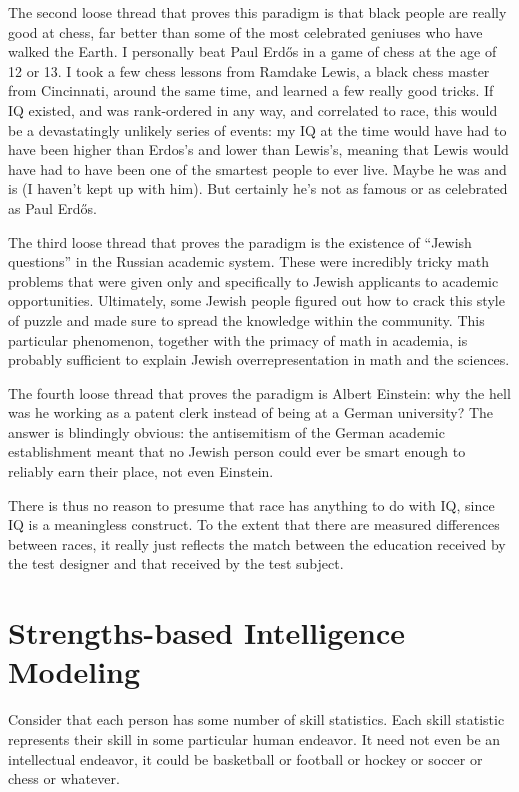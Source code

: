 \documentclass[11pt]{article}
\begin{document}
The second loose thread that proves this paradigm is that black people
are really good at chess, far better than some of the most celebrated
geniuses who have walked the Earth. I personally beat Paul Erd\H{o}s
in a game of chess at the age of 12 or 13. I took a few chess lessons
from Ramdake Lewis, a black chess master from Cincinnati, around the
same time, and learned a few really good tricks. If IQ existed, and
was rank-ordered in any way, and correlated to race, this would be a
devastatingly unlikely series of events: my IQ at the time would have
had to have been higher than Erdos's and lower than Lewis's, meaning
that Lewis would have had to have been one of the smartest people to
ever live. Maybe he was and is (I haven't kept up with him). But
certainly he's not as famous or as celebrated as Paul Erd\H{o}s.

The third loose thread that proves the paradigm is the existence of
``Jewish questions'' in the Russian academic system. These were
incredibly tricky math problems that were given only and specifically
to Jewish applicants to academic opportunities. Ultimately, some
Jewish people figured out how to crack this style of puzzle and made
sure to spread the knowledge within the community. This particular
phenomenon, together with the primacy of math in academia, is probably
sufficient to explain Jewish overrepresentation in math and the
sciences.

The fourth loose thread that proves the paradigm is Albert Einstein:
why the hell was he working as a patent clerk instead of being at a
German university? The answer is blindingly obvious: the antisemitism
of the German academic establishment meant that no Jewish person could
ever be smart enough to reliably earn their place, not even Einstein.

There is thus no reason to presume that race has anything to do with
IQ, since IQ is a meaningless construct. To the extent that there are
measured differences between races, it really just reflects the match
between the education received by the test designer and that received
by the test subject.

\section{Strengths-based Intelligence Modeling}

Consider that each person has some number of skill statistics. Each
skill statistic represents their skill in some particular human
endeavor. It need not even be an intellectual endeavor, it could be
basketball or football or hockey or soccer or chess or whatever.
\end{document}
